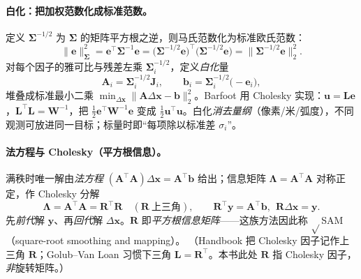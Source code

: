 \paragraph{白化：把加权范数化成标准范数。}\cite{carlone2026handbook,barfoot2024state}
定义 $\boldsymbol{\Sigma}^{-1/2}$ 为 $\boldsymbol{\Sigma}$ 的矩阵平方根之逆，则马氏范数化为标准欧氏范数：
\begin{equation}
  \|\mathbf{e}\|_{\boldsymbol{\Sigma}}^2=\mathbf{e}^\top\boldsymbol{\Sigma}^{-1}\mathbf{e}=\big(\boldsymbol{\Sigma}^{-1/2}\mathbf{e}\big)^\top\big(\boldsymbol{\Sigma}^{-1/2}\mathbf{e}\big)=\big\|\boldsymbol{\Sigma}^{-1/2}\mathbf{e}\big\|_2^2.
  \label{eq:nlopt-whiten}
\end{equation}
对每个因子的雅可比与残差左乘 $\boldsymbol{\Sigma}_i^{-1/2}$，定义\emph{白化}量
\begin{equation}
  \mathbf{A}_i=\boldsymbol{\Sigma}_i^{-1/2}\mathbf{J}_i,\qquad \mathbf{b}_i=\boldsymbol{\Sigma}_i^{-1/2}\big(-\mathbf{e}_i\big),
  \label{eq:nlopt-Ai}
\end{equation}
堆叠成标准最小二乘 $\min_{\Delta\mathbf{x}}\|\mathbf{A}\Delta\mathbf{x}-\mathbf{b}\|_2^2$。Barfoot\cite{barfoot2024state} 用 Cholesky 实现：$\mathbf{u}=\mathbf{L}\mathbf{e}$，$\mathbf{L}^\top\mathbf{L}=\mathbf{W}^{-1}$，把 $\tfrac12\mathbf{e}^\top\mathbf{W}^{-1}\mathbf{e}$ 变成 $\tfrac12\mathbf{u}^\top\mathbf{u}$。白化\emph{消去量纲}（像素/米/弧度），不同观测可放进同一目标；标量时即“每项除以标准差 $\sigma_i$”\cite{carlone2026handbook}。

\paragraph{法方程与 Cholesky（平方根信息）。}\cite{carlone2026handbook,dellaert2017factor}
满秩时唯一解由\emph{法方程} $(\mathbf{A}^\top\mathbf{A})\Delta\mathbf{x}=\mathbf{A}^\top\mathbf{b}$ 给出；信息矩阵 $\boldsymbol{\Lambda}=\mathbf{A}^\top\mathbf{A}$ 对称正定，作 Cholesky 分解
\begin{equation}
  \boldsymbol{\Lambda}=\mathbf{A}^\top\mathbf{A}=\mathbf{R}^\top\mathbf{R}\quad(\mathbf{R}\ \text{上三角}),
  \qquad \mathbf{R}^\top\mathbf{y}=\mathbf{A}^\top\mathbf{b},\ \ \mathbf{R}\Delta\mathbf{x}=\mathbf{y}.
  \label{eq:cholesky}
\end{equation}
先\emph{前代}解 $\mathbf{y}$、再\emph{回代}解 $\Delta\mathbf{x}$。$\mathbf{R}$ 即\emph{平方根信息矩阵}——这族方法因此称 $\sqrt{}$SAM（square-root smoothing and mapping）\cite{dellaert2017factor}。
（Handbook\cite{carlone2026handbook} 把 Cholesky 因子记作上三角 $\mathbf{R}$；Golub--Van Loan 习惯下三角 $\mathbf{L}=\mathbf{R}^\top$。本书此处 $\mathbf{R}$ 指 Cholesky 因子，\emph{非}旋转矩阵。）

